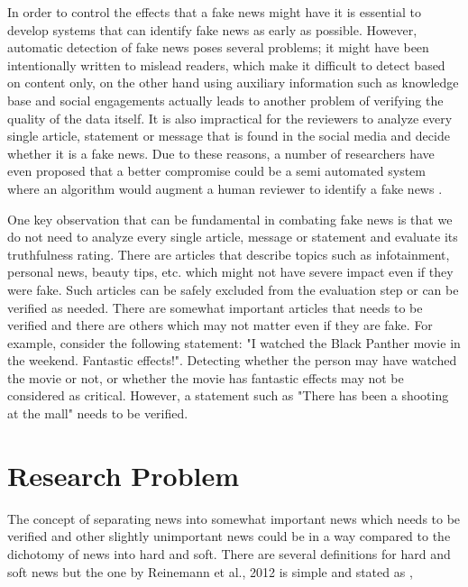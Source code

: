 In order to control the effects that a fake news might have it is essential to develop systems that can identify fake news as early as possible. However, automatic detection of fake news poses several problems; it might have been intentionally written to mislead readers, which make it difficult to detect based on content only, on the other hand using auxiliary information such as knowledge base and social engagements actually leads to another problem of verifying the quality of the data itself\cite{shu2017fake}. It is also impractical for the reviewers to analyze every single article, statement or message that is found in the social media and decide whether it is a fake news. Due to these reasons, a number of researchers have even proposed that a better compromise could be a semi automated system where an algorithm would augment a human reviewer to identify a fake news \cite{conroy2015automatic, chen2015news, wiegand2016veracity}.

One key observation that can be fundamental in combating fake news is that we do not need to analyze every single article, message or statement and evaluate its truthfulness rating. There are articles that describe topics such as infotainment, personal news, beauty tips, etc. which might not have severe impact even if they were fake. Such articles can be safely excluded from the evaluation step or can be verified as needed. 
There are somewhat important articles that needs to be verified and there are others which may not matter even if they are fake.
For example, consider the following statement: "I watched the Black Panther movie in the weekend. Fantastic effects!". Detecting whether the person may have watched the movie or not, or whether the movie has fantastic effects may not be considered as critical. However, a statement such as "There has been a shooting at the mall" needs to be verified. 

\section{Research Problem} \label{intro:research}
The concept of separating news into somewhat important news which needs to be verified and other slightly unimportant news could be in a way compared to the dichotomy of news into hard and soft. There are several definitions for hard and soft news \cite{reinemann2012hard, shoemaker2012news} but the one by Reinemann et al., 2012 is simple and stated as \cite{reinemann2012hard},

